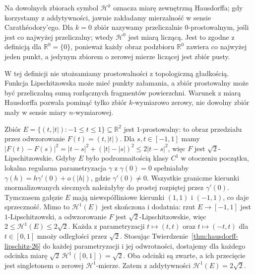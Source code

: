 Na dowolnych zbiorach symbol $\mathcal H^k$ oznacza
miarę zewnętrzną Hausdorffa; gdy korzystamy z addytywności,
jawnie zakładamy mierzalność w sensie Carathéodory'ego.
Dla $k=0$ zbiór nazywamy przeliczalnie $0$-prostowalnym,
jeśli jest co najwyżej przeliczalny; wtedy $\mathcal H^0$
jest miarą liczącą. Jest to zgodne z definicją dla
$\mathbb R^0=\{0\}$, ponieważ każdy obraz podzbioru
$\mathbb R^0$ zawiera co najwyżej jeden punkt,
a jedynym zbiorem o zerowej mierze liczącej jest zbiór pusty.

W tej definicji nie utożsamiamy prostowalności z topologiczną
gładkością. Funkcja Lipschitzowska może mieć punkty załamania,
a zbiór prostowalny może być przeliczalną sumą rozłącznych
fragmentów powierzchni. Warunek z miarą Hausdorffa pozwala
pominąć tylko zbiór $k$-wymiarowo zerowy, nie dowolny zbiór
mały w sensie miary $n$-wymiarowej.

\begin{przyklad}
\label{ex:lip-graph-29}
Zbiór $E=\{(t,|t|):-1\le t\le1\}\subseteq\mathbb R^2$
jest $1$-prostowalny: to obraz przedziału przez odwzorowanie
$F(t)=(t,|t|)$. Dla $s,t\in[-1,1]$ mamy
$|F(t)-F(s)|^2=|t-s|^2+(|t|-|s|)^2\le2|t-s|^2$,
więc $F$ jest $\sqrt2$-Lipschitzowskie.
Gdyby $E$ było podrozmaitością klasy $C^1$ w otoczeniu
początku, lokalna regularna parametryzacja $\gamma$
z $\gamma(0)=0$ spełniałaby
$\gamma(h)=h\gamma'(0)+o(|h|)$, gdzie $\gamma'(0)\ne0$.
Wszystkie graniczne kierunki znormalizowanych siecznych
należałyby do prostej rozpiętej przez $\gamma'(0)$.
Tymczasem gałęzie $E$ mają niewspółliniowe kierunki
$(1,1)$ i $(-1,1)$, co daje sprzeczność. Mimo to $\mathcal H^1(E)$
jest skończona i dodatnia: rzut $E\to[-1,1]$ jest
$1$-Lipschitzowski, a odwzorowanie $F$ jest
$\sqrt2$-Lipschitzowskie, więc
$2\le\mathcal H^1(E)\le2\sqrt2$.
Każda z parametryzacji $t\mapsto(t,t)$ oraz
$t\mapsto(-t,t)$ dla $t\in[0,1]$ mnoży odległości
przez $\sqrt2$. Stosując Twierdzenie~\ref{thm:hausdorff-lipschitz-26}
do każdej parametryzacji i jej odwrotności, dostajemy
dla każdego odcinka miarę $\sqrt2\,\mathcal H^1([0,1])=\sqrt2$.
Oba odcinki są zwarte, a ich przecięcie jest singletonem
o zerowej $\mathcal H^1$-mierze. Zatem z addytywności
$\mathcal H^1(E)=2\sqrt2$.
\end{przyklad}

